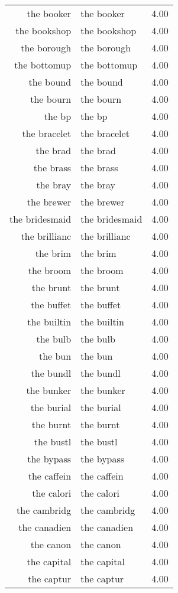 \begin{table}[ht]
\begin{tabular}{rlr}
  the booker & the booker & 4.00 \\ 
  the bookshop & the bookshop & 4.00 \\ 
  the borough & the borough & 4.00 \\ 
  the bottomup & the bottomup & 4.00 \\ 
  the bound & the bound & 4.00 \\ 
  the bourn & the bourn & 4.00 \\ 
  the bp & the bp & 4.00 \\ 
  the bracelet & the bracelet & 4.00 \\ 
  the brad & the brad & 4.00 \\ 
  the brass & the brass & 4.00 \\ 
  the bray & the bray & 4.00 \\ 
  the brewer & the brewer & 4.00 \\ 
  the bridesmaid & the bridesmaid & 4.00 \\ 
  the brillianc & the brillianc & 4.00 \\ 
  the brim & the brim & 4.00 \\ 
  the broom & the broom & 4.00 \\ 
  the brunt & the brunt & 4.00 \\ 
  the buffet & the buffet & 4.00 \\ 
  the builtin & the builtin & 4.00 \\ 
  the bulb & the bulb & 4.00 \\ 
  the bun & the bun & 4.00 \\ 
  the bundl & the bundl & 4.00 \\ 
  the bunker & the bunker & 4.00 \\ 
  the burial & the burial & 4.00 \\ 
  the burnt & the burnt & 4.00 \\ 
  the bustl & the bustl & 4.00 \\ 
  the bypass & the bypass & 4.00 \\ 
  the caffein & the caffein & 4.00 \\ 
  the calori & the calori & 4.00 \\ 
  the cambridg & the cambridg & 4.00 \\ 
  the canadien & the canadien & 4.00 \\ 
  the canon & the canon & 4.00 \\ 
  the capital & the capital & 4.00 \\ 
  the captur & the captur & 4.00 \\ 

\end{tabular}
\end{table}
